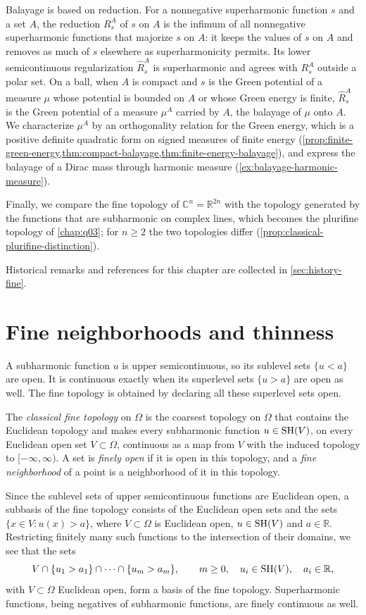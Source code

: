 Balayage is based on reduction. For a nonnegative superharmonic function $s$ and a set $A$, the reduction $R_s^A$ of $s$ on $A$ is the infimum of all nonnegative superharmonic functions that majorize $s$ on $A$: it keeps the values of $s$ on $A$ and removes as much of $s$ elsewhere as superharmonicity permits. Its lower semicontinuous regularization $\widehat R_s^A$ is superharmonic and agrees with $R_s^A$ outside a polar set. On a ball, when $A$ is compact and $s$ is the Green potential of a measure $\mu$ whose potential is bounded on $A$ or whose Green energy is finite, $\widehat R_s^A$ is the Green potential of a measure $\mu^A$ carried by $A$, the balayage of $\mu$ onto $A$. We characterize $\mu^A$ by an orthogonality relation for the Green energy, which is a positive definite quadratic form on signed measures of finite energy (\cref{prop:finite-green-energy,thm:compact-balayage,thm:finite-energy-balayage}), and express the balayage of a Dirac mass through harmonic measure (\cref{ex:balayage-harmonic-measure}).

Finally, we compare the fine topology of $\mathbb C^n=\mathbb R^{2n}$ with the topology generated by the functions that are subharmonic on complex lines, which becomes the plurifine topology of \cref{chap:q03}; for $n\geq2$ the two topologies differ (\cref{prop:classical-plurifine-distinction}).

Historical remarks and references for this chapter are collected in \cref{sec:history-fine}.

\section{Fine neighborhoods and thinness}
\label{sec:fine-neighborhoods}
A subharmonic function $u$ is upper semicontinuous, so its sublevel sets $\{u<a\}$ are open. It is continuous exactly when its superlevel sets $\{u>a\}$ are open as well. The fine topology is obtained by declaring all these superlevel sets open.

\begin{definition}\label{def:classical-fine-topology}
The \emph{classical fine topology} on $\Omega$ is the coarsest topology on $\Omega$ that contains the Euclidean topology and makes every subharmonic function $u\in\mathrm{SH}(V)$, on every Euclidean open set $V\subset\Omega$, continuous as a map from $V$ with the induced topology to $[-\infty,\infty)$. A set is \emph{finely open} if it is open in this topology, and a \emph{fine neighborhood} of a point is a neighborhood of it in this topology.
\end{definition}
Since the sublevel sets of upper semicontinuous functions are Euclidean open, a subbasis of the fine topology consists of the Euclidean open sets and the sets $\{x\in V:u(x)>a\}$, where $V\subset\Omega$ is Euclidean open, $u\in\mathrm{SH}(V)$ and $a\in\mathbb R$. Restricting finitely many such functions to the intersection of their domains, we see that the sets
\[
 V\cap\{u_1>a_1\}\cap\dots\cap\{u_m>a_m\},\qquad m\geq0,\quad u_i\in\mathrm{SH}(V),\quad a_i\in\mathbb R,
\]
with $V\subset\Omega$ Euclidean open, form a basis of the fine topology. Superharmonic functions, being negatives of subharmonic functions, are finely continuous as well.

